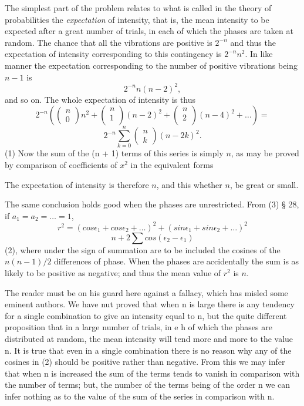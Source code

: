 The simplest part of the problem relates to what is called in the theory of
probabilities the \textit{expectation} of intensity, that is, the mean
intensity to be expected after a great number of trials, in each of which the
phases are taken at random. The chance that all the vibrations are positive is
\(2^{-n}\) and thus the expectation of intensity corresponding to this
contingency is \(2^{-n} n^2\).  In like manner the expectation corresponding to
the number of positive vibrations being \(n-1\) is
\[2^{-n} n (n-2)^2,\]
and so on. The whole expectation of intensity is thus
\[
2^{-n} \left( \begin{pmatrix} n \\ 0 \end{pmatrix} n^2 +
\begin{pmatrix} n \\ 1\\ \end{pmatrix} (n-2)^2 +
\begin{pmatrix} n \\ 2\\ \end{pmatrix} (n-4)^2 + \ldots \right) =
\]
\[ 2^{-n} \sum_{k=0}^n \begin{pmatrix} n \\ k \end{pmatrix} (n-2k)^2. \]
(1) Now the sum of the (n + 1) terms of this series is simply \(n\), as may be
proved by comparison of coefficients of \(x^2\) in the equivalent forms

The expectation of intensity is therefore \(n\), and this whether \(n\), be great or small.

The same conclusion holds good when the phases are unrestricted. From (3) § 28,
if \(a_1 = a_2 = \ldots = 1\),
\[
r^2 = (cos \epsilon_1 + cos \epsilon_2 + \ldots)^2 +
      (sin \epsilon_1 + sin \epsilon_2 + \ldots)^2
\]
\[ n + 2 \sum cos ( \epsilon_2 - \epsilon_1 ) \]
(2), where under the sign of summation are to be included the cosines
of the \(n(n-1)/2\) differences of phase. When the phases are
accidentally the sum is as likely to be positive as negative;
and thus the mean value of
\(r^2\)
is
\(n\).

The reader must be on his guard here against a fallacy, which has misled
some eminent authors. We have nut proved that when n is large there is
any tendency for a single combination to give an intensity equal to n,
but the quite different proposition that in a large number of trials, in
e h of which the phases are distributed at random, the mean intensity
will tend more and more to the value n. It is true that even in a single
combination there is no reason why any of the cosines in (2) should be
positive rather than negative. From this we may infer that when n is
increased the sum of the terms tends to vanish in comparison with the number of
terms; but, the number of the terms being of the order n we can infer nothing
as to the value of the sum of the series in comparison with n.

